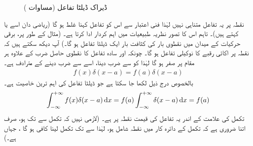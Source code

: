 \begin{figure}
\centering
{}
\caption{ڈیراک ڈیلٹا تفاعل (مساوات )}
\label{شکل_غیر_تابع_ڈیراک_ڈیلٹا_تفاعل}
\end{figure}

نقطہ  پر یہ تفاعل متناہی نہیں  لہٰذا  فنی اعتبار سے  اس کو تفاعل کہنا غلط ہو گا (ریاضی دان اسے  یا  کہتے ہیں)۔ تاہم اس کا تصور نظریہ طبیعیات میں اہم کردار ادا کرتا ہے۔ (مثال کے طور پر، برقی حرکیات کے میدان میں نقطوی  بار کی کثافت بار ایک ڈیلٹا تفاعل ہو گا۔) آپ دیکھ سکتے ہیں کہ  نقطہ  پر اکائی رقبے کا نوکیلی تفاعل ہو گا۔ چونکہ  اور  سادہ تفاعل  کا  نقطوی  حاصل ضرب  کے علاوہ ہر مقام پر صفر ہو گا لہٰذا  کو  سے ضرب دینا، اسے  سے ضرب دینے کے مترادف ہے۔
\begin{align}
f(x)\delta(x-a)=f(a)\delta(x-a)
\end{align}
بالخصوص درج ذیل لکھا جا سکتا ہے جو ڈیلٹا تفاعل کی اہم ترین خاصیت ہے۔ 
\begin{align}\label{مساوات_شروڈنگر_ڈیلٹا_تفاعل_اٹھاتا_ہے}
\int_{-\infty}^{+\infty}f(x)\delta(x-a)\dif{x}=f(a)\int_{-\infty}^{+\infty}\delta(x-a)\dif{x}=f(a)
\end{align}
 تکمل کی علامت کے اندر یہ   تفاعل  کی قیمت نقطہ  پر    ہے۔ (لازمی نہیں کہ تکمل  سے   تک  ہو، صرف اتنا ضروری ہے کہ تکمل کے دائرہ کار میں نقطہ  شامل ہو،  لہٰذا   سے  تک  تکمل لینا کافی ہو گا ، جہاں  ہے۔) 

